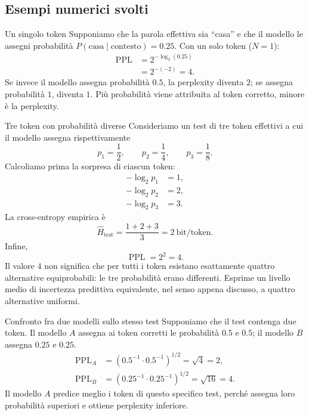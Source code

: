 \subsection{Esempi numerici svolti}

\begin{example}{Un singolo token}
Supponiamo che la parola effettiva sia ``casa'' e che il modello le assegni probabilità $P(\text{casa}\mid\text{contesto})=0.25$. Con un solo token ($N=1$):
\begin{align}
\operatorname{PPL}
&=2^{-\log_2(0.25)}\\
&=2^{-(-2)}=4.
\end{align}
Se invece il modello assegna probabilità $0.5$, la perplexity diventa $2$; se assegna probabilità $1$, diventa $1$. Più probabilità viene attribuita al token corretto, minore è la perplexity.
\end{example}

\begin{example}{Tre token con probabilità diverse}
Consideriamo un test di tre token effettivi a cui il modello assegna rispettivamente
\begin{equation}
p_1=\frac12,\qquad p_2=\frac14,\qquad p_3=\frac18.
\end{equation}
Calcoliamo prima la sorpresa di ciascun token:
\begin{align}
-\log_2 p_1&=1,\\
-\log_2 p_2&=2,\\
-\log_2 p_3&=3.
\end{align}
La cross-entropy empirica è
\begin{equation}
\widehat H_{\mathrm{test}}=\frac{1+2+3}{3}=2\ \text{bit/token}.
\end{equation}
Infine,
\begin{equation}
\boxed{\operatorname{PPL}=2^2=4}.
\end{equation}
Il valore $4$ non significa che per tutti i token esistano esattamente quattro alternative equiprobabili: le tre probabilità erano differenti. Esprime un livello medio di incertezza predittiva equivalente, nel senso appena discusso, a quattro alternative uniformi.
\end{example}

\begin{example}{Confronto fra due modelli sullo stesso test}
Supponiamo che il test contenga due token. Il modello $A$ assegna ai token corretti le probabilità $0.5$ e $0.5$; il modello $B$ assegna $0.25$ e $0.25$.
\begin{align}
\operatorname{PPL}_A&=(0.5^{-1}\cdot0.5^{-1})^{1/2}=\sqrt4=2,\\
\operatorname{PPL}_B&=(0.25^{-1}\cdot0.25^{-1})^{1/2}=\sqrt{16}=4.
\end{align}
Il modello $A$ predice meglio i token di questo specifico test, perché assegna loro probabilità superiori e ottiene perplexity inferiore.
\end{example}

